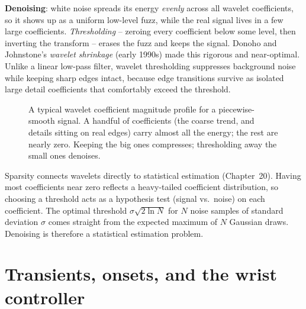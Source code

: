 \textbf{Denoising}: white noise spreads its energy \emph{evenly} across all
wavelet coefficients, so it shows up as a uniform low-level fuzz, while the real
signal lives in a few large coefficients. \emph{Thresholding} -- zeroing every
coefficient below some level, then inverting the transform -- erases the fuzz and
keeps the signal. Donoho and Johnstone's \emph{wavelet shrinkage} (early 1990s)
made this rigorous and near-optimal. Unlike a linear low-pass filter,
wavelet thresholding suppresses background noise while keeping sharp edges intact,
because edge transitions survive as isolated large detail coefficients that comfortably exceed
the threshold.

\begin{figure}[H]
\centering
{}
\caption{A typical wavelet coefficient magnitude profile for a piecewise-smooth
signal. A handful of coefficients (the coarse trend, and details sitting on real
edges) carry almost all the energy; the rest are nearly zero. Keeping the big ones
compresses; thresholding away the small ones denoises.}
\label{ch24:compaction}
\end{figure}

\begin{connectionbox}
Sparsity connects wavelets directly to statistical estimation (Chapter~20). Having most
coefficients near zero reflects a heavy-tailed coefficient
distribution, so choosing a threshold acts as a hypothesis test (signal vs.\ noise) on each
coefficient. The optimal threshold $\sigma\sqrt{2\ln N}$ for $N$ noise samples of
standard deviation $\sigma$ comes straight from the expected maximum of
$N$ Gaussian draws. Denoising is therefore a statistical estimation problem.
\end{connectionbox}

\section{Transients, onsets, and the wrist controller}
\label{ch24:onsets}

